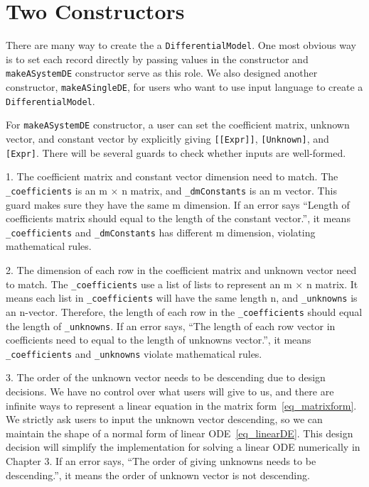 \section{Two Constructors}
There are many way to create the a \verb|DifferentialModel|. One most obvious way is to set each record directly by passing values in the constructor and \verb|makeASystemDE| constructor serve as this role. We also designed another constructor, \verb|makeASingleDE|, for users who want to use input language to create a \verb|DifferentialModel|.

For \verb|makeASystemDE| constructor, a user can set the coefficient matrix, unknown vector, and constant vector by explicitly giving \verb|[[Expr]]|, \verb|[Unknown]|, and \verb|[Expr]|. There will be several guards to check whether inputs are well-formed.

1. The coefficient matrix and constant vector dimension need to match. The \verb|_coefficients| is an m $\times$ n matrix, and \verb|_dmConstants| is an m vector. This guard makes sure they have the same m dimension. If an error says ``Length of coefficients matrix should equal to the length of the constant vector.'', it means \verb|_coefficients| and \verb|_dmConstants| has different m dimension, violating mathematical rules.

2. The dimension of each row in the coefficient matrix and unknown vector need to match. The \verb|_coefficients| use a list of lists to represent an m $\times$ n matrix. It means each list in \verb|_coefficients| will have the same length n, and \verb|_unknowns| is an n-vector. Therefore, the length of each row in the \verb|_coefficients| should equal the length of \verb|_unknowns|. If an error says, ``The length of each row vector in coefficients need to equal to the length of unknowns vector.'', it means \verb|_coefficients| and \verb|_unknowns| violate mathematical rules.

3. The order of the unknown vector needs to be descending due to design decisions. We have no control over what users will give to us, and there are infinite ways to represent a linear equation in the matrix form~\ref{eq_matrixform}. We strictly ask users to input the unknown vector descending, so we can maintain the shape of a normal form of linear ODE~\ref{eq_linearDE}. This design decision will simplify the implementation for solving a linear ODE numerically in Chapter 3. If an error says, ``The order of giving unknowns needs to be descending.'', it means the order of unknown vector is not descending.

